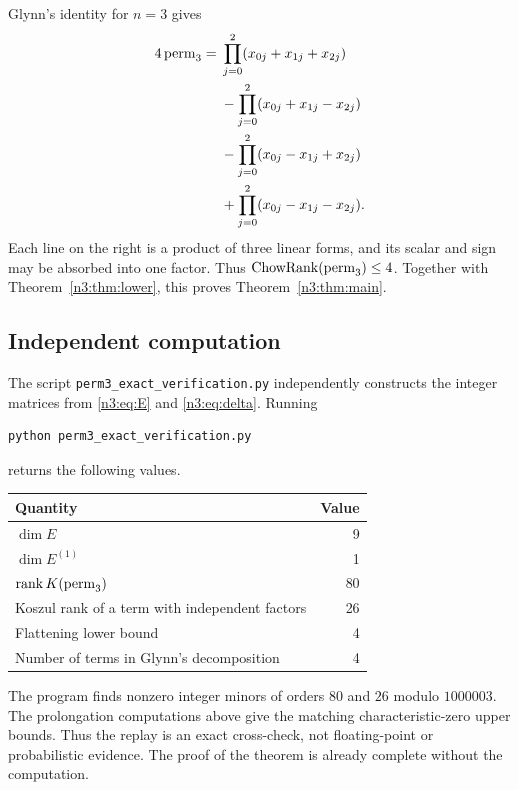 Glynn's identity for \(n=3\) gives
\begin{align}\label{n3:eq:glynn}
4\operatorname{perm}_3={}&\prod_{j=0}^{2}(x_{0j}+x_{1j}+x_{2j})\notag\\
&-\prod_{j=0}^{2}(x_{0j}+x_{1j}-x_{2j})\notag\\
&-\prod_{j=0}^{2}(x_{0j}-x_{1j}+x_{2j})\\
&+\prod_{j=0}^{2}(x_{0j}-x_{1j}-x_{2j}).\notag
\end{align}
Each line on the right is a product of three linear forms, and its scalar and
sign may be absorbed into one factor. Thus \(\operatorname{ChowRank}(\operatorname{perm}_3)\leq4\).
Together with Theorem~\ref{n3:thm:lower}, this proves
Theorem~\ref{n3:thm:main}.

\subsection{Independent computation}

The script \texttt{perm3\_exact\_verification.py} independently constructs
the integer matrices from \eqref{n3:eq:E} and \eqref{n3:eq:delta}. Running
\begin{verbatim}
python perm3_exact_verification.py
\end{verbatim}
returns the following values.
\begin{center}
\begin{tabular}{@{}lr@{}}
\toprule
Quantity & Value\\
\midrule
\(\dim E\) & 9\\
\(\dim E^{(1)}\) & 1\\
\(\operatorname{rank} K(\operatorname{perm}_3)\) & 80\\
Koszul rank of a term with independent factors & 26\\
Flattening lower bound & 4\\
Number of terms in Glynn's decomposition & 4\\
\bottomrule
\end{tabular}
\end{center}
The program finds nonzero integer minors of orders \(80\) and \(26\) modulo
\(1000003\). The prolongation computations above give the matching
characteristic-zero upper bounds. Thus the replay is an exact cross-check,
not floating-point or probabilistic evidence. The proof of the theorem is
already complete without the computation.
